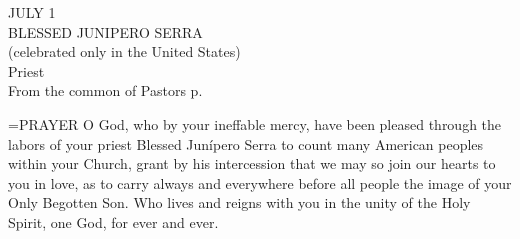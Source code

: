 \begin{center}\normalsize JULY 1\\
\footnotesize BLESSED JUNIPERO SERRA\\
\footnotesize (celebrated only in the United States)\\
\footnotesize Priest\\
\footnotesize From the common of Pastors p. \\
\end{center}

\hangindent=\parindent \small{PRAYER 
O God, who by your ineffable mercy,
have been pleased through the labors
of your priest Blessed Junípero Serra
to count many American peoples within your Church,
grant by his intercession
that we may so join our hearts to you in love,
as to carry always and everywhere before all people
the image of your Only Begotten Son.
Who lives and reigns with you in the unity of the Holy Spirit,
one God, for ever and ever.\\}
 
